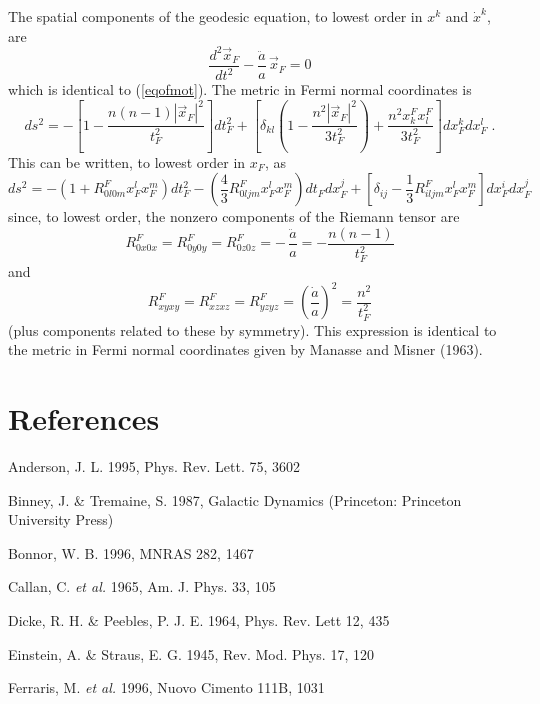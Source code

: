 The spatial components of the geodesic equation, to lowest order in $x^k$
and $\dot{x}^k$, are \begin{equation}
\frac{d^2\vec{x}_F}{dt^2}-\frac{\ddot{a}}{a}\, \vec{x}_F=0 \end{equation}
which is identical to (\ref{eqofmot}). The metric in Fermi normal
coordinates is 
\begin{equation}
ds^2=-\left[1-\frac{n(n-1)|\vec{x}_F|^2}{t_F^2}\right]dt^2_F+
\left[\delta_{kl}\left(1-
\frac{n^2|\vec{x}_F|^2}{3t_F^2}\right)+\frac{n^2x_k^Fx_l^F}{3t^2_F}
\right]dx_F^kdx_F^l \; .  
\end{equation} 
This can be written, to lowest
order in $x_F$, as 
\begin{equation}
ds^2=-(1+R^F_{0l0m}x^l_Fx^m_F)dt^2_F-\left(\frac{4}{3}R^F_{0ljm}x_F^lx_F^m
\right)dt_F dx^j_F+\left[ \delta_{ij}-\frac{1}{3}R^F_{iljm}x^l_Fx^m_F
\right] dx^i_Fdx^j_F 
\end{equation} 
since, to lowest order, the nonzero
components of the Riemann tensor are 
\begin{equation}
R^F_{0x0x}=R^F_{0y0y}=R^F_{0z0z}=-\,
\frac{\ddot{a}}{a}=-\frac{n(n-1)}{t_F^2} 
\end{equation} 
and
\begin{equation}
R^F_{xyxy}=R^F_{xzxz}=R^F_{yzyz}=\left(\frac{\dot{a}}{a}\right)^2=\frac{n^2}
{t_F^2} \end{equation} (plus components related to these by symmetry).
This expression is identical to the metric in Fermi normal coordinates
given by Manasse and Misner (1963). 
  \clearpage
  
  \section*{References}
  
  \noindent Anderson, J. L. 1995, Phys. Rev. Lett. 75, 3602
  
  \noindent Binney, J. \& Tremaine, S. 1987, Galactic Dynamics (Princeton:
  Princeton University Press)
  
  \noindent  Bonnor, W. B. 1996, MNRAS 282, 1467
  
  \noindent Callan, C. {\em et al.} 1965, Am. J. Phys. 33, 105
  
  \noindent Dicke, R. H. \& Peebles, P. J. E. 1964, Phys. Rev. Lett 12, 435
  
  \noindent Einstein, A. \& Straus, E. G. 1945, Rev. Mod. Phys. 17, 120
  
  \noindent Ferraris, M. {\em et al.} 1996, Nuovo Cimento 111B, 1031
  
